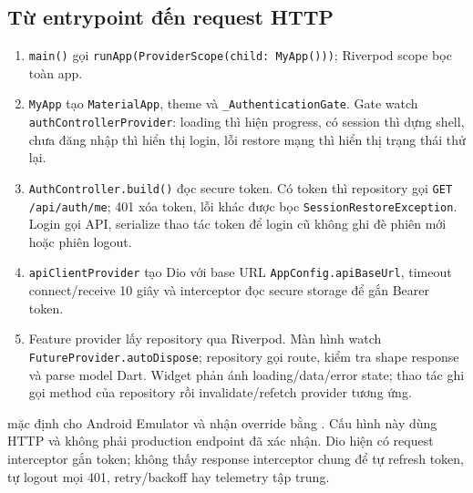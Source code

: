 \documentclass[11pt,a4paper]{article}
\begin{document}
\subsection{Từ entrypoint đến request HTTP}
\begin{enumerate}
  \item \texttt{main()} gọi \texttt{runApp(ProviderScope(child: MyApp()))}; Riverpod scope bọc toàn app.
  \item \texttt{MyApp} tạo \texttt{MaterialApp}, theme và \texttt{\_AuthenticationGate}. Gate watch \texttt{authControllerProvider}: loading thì hiện progress, có session thì dựng shell, chưa đăng nhập thì hiển thị login, lỗi restore mạng thì hiển thị trạng thái thử lại.
  \item \texttt{AuthController.build()} đọc secure token. Có token thì repository gọi \texttt{GET /api/auth/me}; 401 xóa token, lỗi khác được bọc \texttt{SessionRestoreException}. Login gọi API, serialize thao tác token để login cũ không ghi đè phiên mới hoặc phiên logout.
  \item \texttt{apiClientProvider} tạo Dio với base URL \texttt{AppConfig.apiBaseUrl}, timeout connect/receive 10 giây và interceptor đọc secure storage để gắn Bearer token.
  \item Feature provider lấy repository qua Riverpod. Màn hình watch \texttt{FutureProvider.autoDispose}; repository gọi route, kiểm tra shape response và parse model Dart. Widget phản ánh loading/data/error state; thao tác ghi gọi method của repository rồi invalidate/refetch provider tương ứng.
\end{enumerate}

 mặc định  cho Android Emulator và nhận override bằng . Cấu hình này dùng HTTP và không phải production endpoint đã xác nhận. Dio hiện có request interceptor gắn token; không thấy response interceptor chung để tự refresh token, tự logout mọi 401, retry/backoff hay telemetry tập trung.
\end{document}
